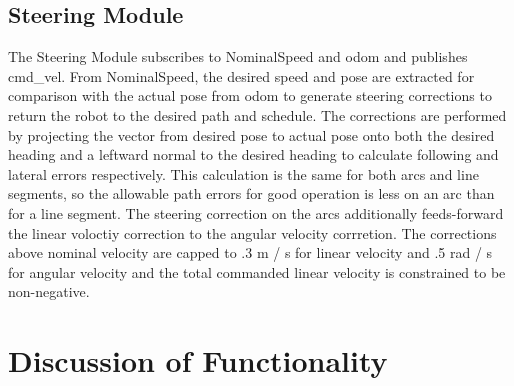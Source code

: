 \documentclass{article}
\begin{document}
\subsection{Steering Module}

The Steering Module subscribes to NominalSpeed and odom and publishes cmd_vel.
From NominalSpeed, the desired speed and pose are extracted for comparison with the actual pose from odom to generate steering corrections to return the robot to the desired path and schedule.
The corrections are performed by projecting the vector from desired pose to actual pose onto both the desired heading and a leftward normal to the desired heading to calculate following and lateral errors respectively.
This calculation is the same for both arcs and line segments, so the allowable path errors for good operation is less on an arc than for a line segment.
The steering correction on the arcs additionally feeds-forward the linear voloctiy correction to the angular velocity corrretion.
The corrections above nominal velocity are capped to .3 m / s for linear velocity and .5 rad / s for angular velocity and the total commanded linear velocity is constrained to be non-negative.

\section{Discussion of Functionality}
\end{document}
